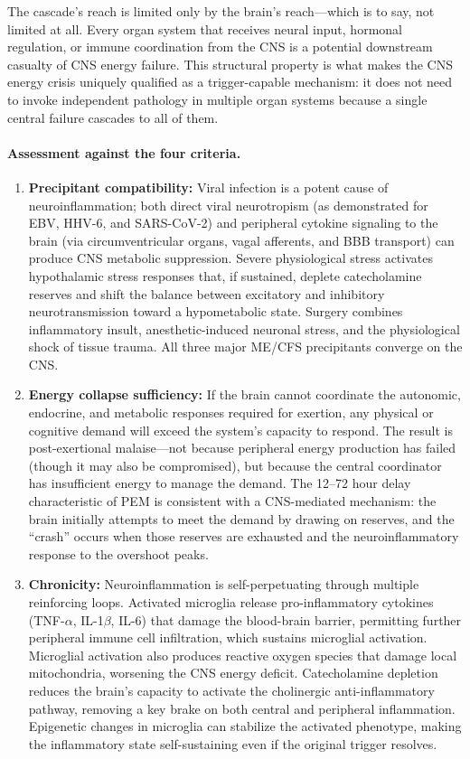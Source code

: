 The cascade's reach is limited only by the brain's reach---which is to say, not limited at all. Every organ system that receives neural input, hormonal regulation, or immune coordination from the CNS is a potential downstream casualty of CNS energy failure. This structural property is what makes the CNS energy crisis uniquely qualified as a trigger-capable mechanism: it does not need to invoke independent pathology in multiple organ systems because a single central failure cascades to all of them.

\paragraph{Assessment against the four criteria.}

\begin{enumerate}
    \item \textbf{Precipitant compatibility:} Viral infection is a potent cause of neuroinflammation; both direct viral neurotropism (as demonstrated for EBV, HHV-6, and SARS-CoV-2) and peripheral cytokine signaling to the brain (via circumventricular organs, vagal afferents, and BBB transport) can produce CNS metabolic suppression. Severe physiological stress activates hypothalamic stress responses that, if sustained, deplete catecholamine reserves and shift the balance between excitatory and inhibitory neurotransmission toward a hypometabolic state. Surgery combines inflammatory insult, anesthetic-induced neuronal stress, and the physiological shock of tissue trauma. All three major ME/CFS precipitants converge on the CNS.

    \item \textbf{Energy collapse sufficiency:} If the brain cannot coordinate the autonomic, endocrine, and metabolic responses required for exertion, any physical or cognitive demand will exceed the system's capacity to respond. The result is post-exertional malaise---not because peripheral energy production has failed (though it may also be compromised), but because the central coordinator has insufficient energy to manage the demand. The 12--72 hour delay characteristic of PEM is consistent with a CNS-mediated mechanism: the brain initially attempts to meet the demand by drawing on reserves, and the ``crash'' occurs when those reserves are exhausted and the neuroinflammatory response to the overshoot peaks.

    \item \textbf{Chronicity:} Neuroinflammation is self-perpetuating through multiple reinforcing loops. Activated microglia release pro-inflammatory cytokines (TNF-$\alpha$, IL-1$\beta$, IL-6) that damage the blood-brain barrier, permitting further peripheral immune cell infiltration, which sustains microglial activation. Microglial activation also produces reactive oxygen species that damage local mitochondria, worsening the CNS energy deficit. Catecholamine depletion reduces the brain's capacity to activate the cholinergic anti-inflammatory pathway, removing a key brake on both central and peripheral inflammation. Epigenetic changes in microglia can stabilize the activated phenotype, making the inflammatory state self-sustaining even if the original trigger resolves.


\end{enumerate}
